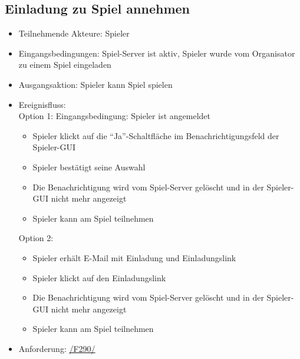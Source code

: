 \documentclass[a4paper]{scrreprt}
\begin{document}
    \subsection{Einladung zu Spiel annehmen}
    \begin{itemize}
        \item Teilnehmende Akteure: \Gls{Spieler}

        \item Eingangsbedingungen: \Gls{Spiel-Server} ist aktiv, Spieler wurde vom \Gls{Organisator} zu einem Spiel eingeladen
        \item Ausgangsaktion: \Gls{Spieler} kann \Gls{Spiel} spielen
        \item Ereignisfluss:\\
        Option 1: 
        Eingangsbedingung: \Gls{Spieler} ist angemeldet
        \begin{itemize}
            \item \Gls{Spieler} klickt auf die \enquote{Ja}-Schaltfläche im Benachrichtigungsfeld der Spieler-GUI
            \item \Gls{Spieler} bestätigt seine Auswahl
            \item Die Benachrichtigung wird vom \Gls{Spiel-Server} gelöscht und in der Spieler-GUI nicht mehr angezeigt
            \item \Gls{Spieler} kann am \Gls{Spiel} teilnehmen
        \end{itemize}
        Option 2: 
        \begin{itemize}
            \item \Gls{Spieler} erhält E-Mail mit Einladung und Einladungslink
            \item \Gls{Spieler} klickt auf den Einladungslink
            \item Die Benachrichtigung wird vom \Gls{Spiel-Server} gelöscht und in der Spieler-GUI nicht mehr angezeigt
            \item \Gls{Spieler} kann am \Gls{Spiel} teilnehmen
        \end{itemize}

        \item Anforderung: \hyperlink{F290}{/F290/}
    \end{itemize}
\end{document}
